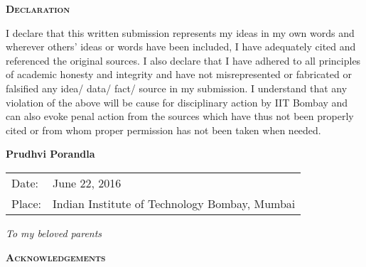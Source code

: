 \newpage
\thispagestyle{empty}
\begin{center}
  \begin{Huge}
    \textsc{\textbf{Declaration}}
  \end{Huge}
\end{center}

\vspace{0.5in}

 I declare that this written submission represents my ideas in my own words and wherever others' ideas or words have been included, I have adequately cited and referenced the original sources. I also declare that I have adhered to all principles of academic honesty and integrity and have not misrepresented or fabricated or falsified any idea/ data/ fact/ source in my submission. I understand that any violation of the above will be cause for disciplinary action by IIT Bombay and can also evoke penal action from the sources which have thus not been properly cited or from whom proper permission has not been taken when needed.

\vspace{1.5in}
\hfill \textbf{Prudhvi Porandla}\\
\noindent
\begin{tabular}{ll}
Date: & June 22, 2016\\ \vspace{30pt}
Place: & Indian Institute of Technology Bombay, Mumbai\\
\end{tabular}
% 

  \newpage
  \thispagestyle{empty}    %

  \begin{center}  \null\vfill
   \textit{\Large To my beloved parents}
  \null\vfill
  \end{center}



\newpage
\thispagestyle{empty}
\begin{center}
  \begin{Huge}
    \textsc{\textbf{Acknowledgements}}
  \end{Huge}
\end{center}

